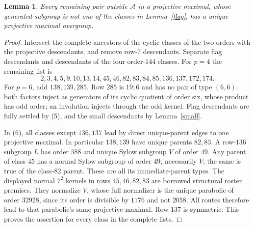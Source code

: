 \documentclass[11pt,a4paper]{article}
\newtheorem{lemma}{Lemma}
\begin{document}
\begin{lemma}\label{exhaust}
Every remaining pair outside $\mathcal A$ in a projective maximal,
whose generated subgroup is not one of the classes in
Lemma~\ref{flag}, has a unique projective maximal overgroup.
\end{lemma}
\begin{proof}
Intersect the complete ancestors of the cyclic classes of the two
orders with the projective descendants, and remove row-$7$
descendants. Separate flag descendants and descendants of the
four order-$144$ classes. For $p=4$ the remaining list is
\[
2,3,4,5,9,10,13,14,45,46,82,83,84,85,136,137,172,174.        \tag{6}
\]
For $p=6$, add $138,139,285$. Row $285$ is $19:6$ and has no
pair of type $(6,6)$: both factors inject as generators of its
cyclic quotient of order six, whose product has odd order;
an involution injects through the odd kernel. Flag descendants
are fully settled by (5), and the small descendants by
Lemma~\ref{small}.

In (6), all classes except $136,137$ lead by direct unique-parent
edges to one projective maximal. In particular $138,139$ have
unique parents $82,83$. A row-$136$ subgroup $L$ has order $588$
and unique Sylow subgroup $V$ of order $49$. Any parent of class
$45$ has a normal Sylow subgroup of order $49$, necessarily $V$;
the same is true of the class-$82$ parent. These are all its
immediate-parent types. The displayed normal $7^2$ kernels in rows
$45,46,82,83$ are borrowed structural roster premises. They normalize
$V$, whose full normalizer
is the unique parabolic of order $32928$, since its order is
divisible by $1176$ and not $2058$. All routes therefore lead
to that parabolic's same projective maximal. Row $137$ is symmetric.
This proves the assertion for every class in the complete lists.
\end{proof}
\end{document}
